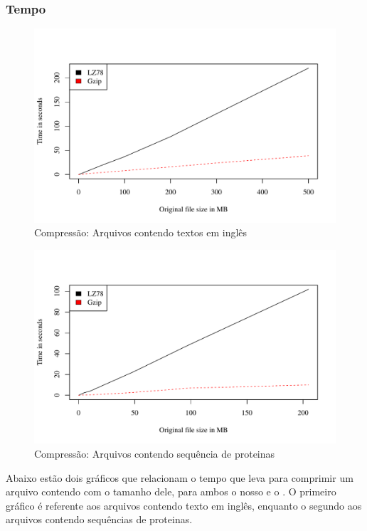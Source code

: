 \subsubsection{Tempo}


\begin{figure}
\includegraphics[scale=0.74]{../experiments/R/pdf/time_comp}
\caption{Compressão: Arquivos contendo textos em inglês}
\end{figure}

\begin{figure}
\includegraphics[scale=0.74]{../experiments/R/pdf/proteins_time_comp}
\caption{Compressão: Arquivos contendo sequência de proteinas}
\end{figure}


Abaixo estão dois gráficos que relacionam o tempo que leva para comprimir um arquivo
contendo com o tamanho dele, para ambos o nosso \lz e o \gzip. O primeiro
gráfico é referente aos arquivos contendo texto em inglês, enquanto o segundo
aos arquivos contendo sequências de proteinas.

